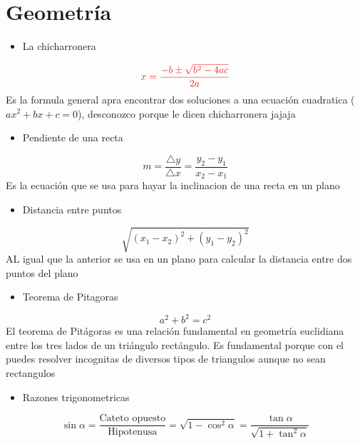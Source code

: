 \documentclass[4apaper, 12pt]{article}
\begin{document}
 \section{Geometría}
    \begin{itemize}
        \item[\blacklozenge]{La chicharronera}
    \end{itemize}
    \begin{equation}
        \textcolor{Red} {x = \frac {-b \pm \sqrt {b^2 - 4ac}}{2a}}
    \end{equation}
    Es la formula general apra encontrar dos soluciones a una ecuación cuadratica ($a x^2 + b x + c = 0$), desconozco porque le dicen chicharronera jajaja
    \begin{itemize}
        \item {Pendiente de una recta}
    \end{itemize}
    \begin{equation}
        m=\frac{\triangle y}{\triangle x}=\frac{y_2-y_1}{x_2-x_1}	
    \end{equation}
    Es la ecuación que se usa para hayar la inclinacion de una recta en un plano 
    \begin{itemize}
        \item[\clubsuit]{Distancia entre puntos}
    \end{itemize}
    \begin{equation}
        \sqrt{(x_1 - x_2)^2 + (y_1 - y_2)^2}
    \end{equation}
    AL igual que la anterior se usa en un plano para calcular la distancia entre dos puntos del plano
    \begin{itemize}
        \item [\bigstar] {Teorema de Pitagoras}
    \end{itemize}
    \begin{equation}
      a^2+b^2=c^2
    \end{equation}
    El teorema de Pitágoras es una relación fundamental en geometría euclidiana entre los tres lados de un triángulo rectángulo. Es fundamental porque con el puedes resolver incognitas de diversos tipos de triangulos aunque no sean rectangulos
    \begin{itemize}
        \item [\checkmark]{Razones trigonometricas}
    \end{itemize}
    \begin{equation}
        \sin \alpha=\dfrac {\text{
        Cateto opuesto}}
        {\text{Hipotenusa}}=
        \sqrt{1-\cos^2\alpha}
        =\dfrac {\tan \alpha}
        {\sqrt{1+\tan^2\alpha}}
        \end{equation}
\end{document}
